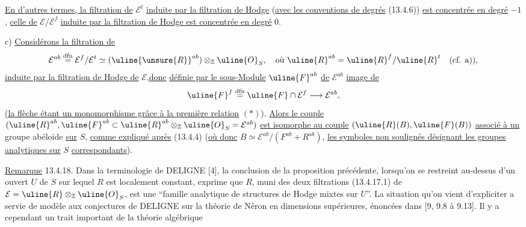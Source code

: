 \uline{En d'autres termes, la filtration de} $\mathcal E^t$ \uline{induite par la filtration de Hodge} (\uline{avec les conventions de degrés} (13.4.6)) \uline{est concentrée en degré} $-1$, \uline{celle de} $\mathcal E/\mathcal E^f$ \uline{induite par la filtration de Hodge est concentrée en degré} $0$.

c) \uline{Considérons la filtration de}
\[
\mathcal E^{ab}\overset{\mathrm{dfn}}=\mathcal E^f/\mathcal E^t\simeq(\uline{\unsure{R}}^{ab})\otimes_{\mathbb Z}\uline{O}_S,\quad\text{où }\uline{R}^{ab}=\uline{R}^f/\uline{R}^t\quad(\text{cf. a)}),
\]
\uline{induite par la filtration de Hodge de} $\mathcal E$,\uline{donc} \uline{définie par le sous-Module} $\uline{F}^{ab}$ \uline{de} $\mathcal E^{ab}$ \uline{image de}
\[
\uline{F}^f\overset{\mathrm{dfn}}=\uline{F}\cap\mathcal E^f\longrightarrow\mathcal E^{ab},
\]
\uline{(la flèche étant un monomorphisme grâce à la première relation} $(*)$).
\uline{Alors le couple} $(\uline{R}^{ab},\uline{F}^{ab}\subset\uline{R}^{ab}\otimes_{\mathbb Z}\uline{O}_S=\mathcal E^{ab})$ \uline{est isomorphe au couple} $(\uline{R}(B),\uline{F}(B))$ \uline{associé à un} groupe abéloïde \uline{sur} $S$, \uline{comme expliqué après} (13.4.4) (\uline{où donc} $B\simeq\mathcal E^{ab}/(F^{ab}+R^{ab})$, \uline{les symboles non soulignés désignant les groupes analytiques sur} $S$ \uline{correspondants}).

\uline{Remarque} 13.4.18. Dans la terminologie de DELIGNE [4], la conclusion de la proposition précédente, lorsqu'on se restreint au-dessus d'un ouvert $U$ de $S$ sur lequel $R$ est localement constant, exprime que $R$, muni des deux filtrations (13.4.17.1) de $\mathcal E=\uline{R}\otimes_{\mathbb Z}\uline{O}_S$, est une ``famille analytique de structures de Hodge mixtes sur $U$''. La situation qu'on vient d'expliciter a servie de modèle aux conjectures de DELIGNE sur la théorie de Néron en dimensions supérieures, énoncées dans [9, 9.8 à 9.13]. Il y a cependant un trait important de la théorie algébrique

